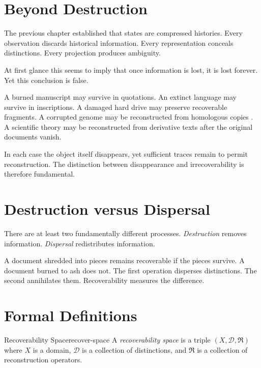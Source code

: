 \documentclass[12pt,twoside,openright]{book}
\begin{document}
\section{Beyond Destruction}
\label{sec:ch5-beyond}

The previous chapter established that states are
compressed histories. Every observation discards historical
information. Every representation conceals distinctions.
Every projection produces ambiguity.

At first glance this seems to imply that once information
is lost, it is lost forever. Yet this conclusion is false.

A burned manuscript may survive in quotations.
An extinct language may survive in inscriptions.
A damaged hard drive may preserve recoverable fragments.
A corrupted genome may be reconstructed from homologous
copies \parencite{kauffman1993}.
A scientific theory may be reconstructed from derivative
texts after the original documents vanish.

In each case the object itself disappears, yet sufficient
traces remain to permit reconstruction. The distinction
between disappearance and irrecoverability is therefore
fundamental.

\section{Destruction versus Dispersal}
\label{sec:ch5-dispersal}

There are at least two fundamentally different processes.
\emph{Destruction} removes information.
\emph{Dispersal} redistributes information.

A document shredded into pieces remains recoverable if
the pieces survive. A document burned to ash does not.
The first operation disperses distinctions. The second
annihilates them. Recoverability measures the difference.

\section{Formal Definitions}
\label{sec:ch5-formal}

\begin{definition}{Recoverability Space}{recover-space}
  A \emph{recoverability space} is a triple
  $(X, \mathcal{D}, \mathfrak{R})$ where $X$ is a domain,
  $\mathcal{D}$ is a collection of distinctions, and
  $\mathfrak{R}$ is a collection of reconstruction
  operators.
\end{definition}
\end{document}
